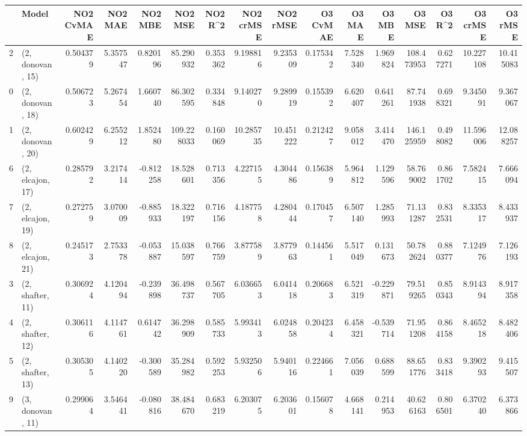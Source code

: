 \begin{tabular}{llrrrrrrrrrrrrrr}
\toprule
{} &             Model &  NO2 CvMAE &   NO2 MAE &   NO2 MBE &     NO2 MSE &   NO2 R\textasciicircum2 &  NO2 crMSE &   NO2 rMSE &  O3 CvMAE &    O3 MAE &    O3 MBE &      O3 MSE &    O3 R\textasciicircum2 &   O3 crMSE &    O3 rMSE \\
\midrule
2  &  (2, donovan, 15) &   0.504379 &  5.357547 &  0.820196 &   85.290932 &  0.353362 &   9.198816 &   9.235309 &  0.175342 &  7.528340 &  1.969824 &  108.473953 &  0.627271 &  10.227108 &  10.415083 \\
0  &  (2, donovan, 18) &   0.506723 &  5.267454 &  1.660740 &   86.302595 &  0.334848 &   9.140270 &   9.289919 &  0.155392 &  6.620407 &  0.641261 &   87.741938 &  0.698321 &   9.345091 &   9.367067 \\
1  &  (2, donovan, 20) &   0.602429 &  6.255212 &  1.852480 &  109.228033 &  0.160069 &  10.285735 &  10.451222 &  0.212427 &  9.058012 &  3.414470 &  146.125959 &  0.498082 &  11.596006 &  12.088257 \\
6  &  (2, elcajon, 17) &   0.285792 &  3.217414 & -0.812258 &   18.528601 &  0.713356 &   4.227155 &   4.304486 &  0.156389 &  5.964812 &  1.129596 &   58.769002 &  0.861702 &   7.582415 &   7.666094 \\
7  &  (2, elcajon, 19) &   0.272759 &  3.070009 & -0.885933 &   18.322197 &  0.716156 &   4.187758 &   4.280444 &  0.170457 &  6.507140 &  1.285993 &   71.131287 &  0.832531 &   8.335317 &   8.433937 \\
8  &  (2, elcajon, 21) &   0.245173 &  2.753378 & -0.053887 &   15.038597 &  0.766759 &   3.877589 &   3.877963 &  0.144561 &  5.517049 &  0.131673 &   50.782624 &  0.880377 &   7.124976 &   7.126193 \\
3  &  (2, shafter, 11) &   0.306924 &  4.120494 & -0.239898 &   36.498737 &  0.567705 &   6.036653 &   6.041418 &  0.206683 &  6.521319 & -0.229871 &   79.519265 &  0.850343 &   8.914394 &   8.917358 \\
4  &  (2, shafter, 12) &   0.306116 &  4.114761 &  0.614742 &   36.298909 &  0.585733 &   5.993413 &   6.024858 &  0.204234 &  6.458321 & -0.539714 &   71.951208 &  0.864158 &   8.465218 &   8.482406 \\
5  &  (2, shafter, 13) &   0.305305 &  4.140220 & -0.300589 &   35.284982 &  0.592253 &   5.932506 &   5.940116 &  0.224661 &  7.056039 &  0.688599 &   88.651776 &  0.833418 &   9.390293 &   9.415507 \\
9  &  (3, donovan, 11) &   0.299064 &  3.546441 & -0.080816 &   38.484670 &  0.683219 &   6.203075 &   6.203601 &  0.156078 &  4.668141 &  0.214953 &   40.626163 &  0.806501 &   6.370240 &   6.373866 \\

\end{tabular}

